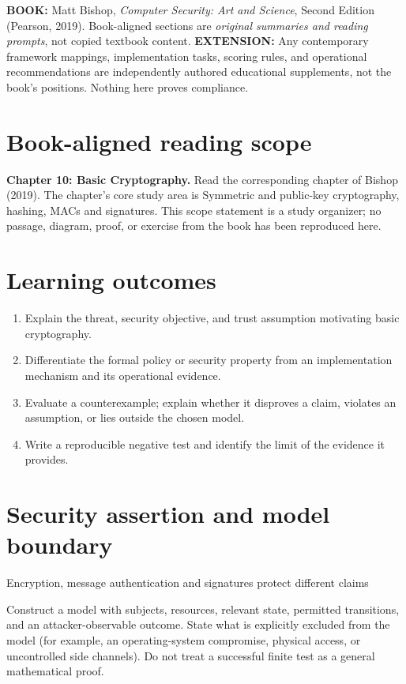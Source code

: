 \documentclass[10pt,letterpaper]{article}
\begin{document}
\makedoctocpage
\begin{notebox}
\textbf{BOOK:} Matt Bishop, \emph{Computer Security: Art and Science}, Second Edition (Pearson, 2019). Book-aligned sections are \emph{original summaries and reading prompts}, not copied textbook content.
\textbf{EXTENSION:} Any contemporary framework mappings, implementation tasks, scoring rules, and operational recommendations are independently authored educational supplements, not the book's positions. Nothing here proves compliance.
\end{notebox}
\section{Book-aligned reading scope}
\textbf{Chapter 10: Basic Cryptography.} Read the corresponding chapter of Bishop (2019). The chapter's core study area is Symmetric and public-key cryptography, hashing, MACs and signatures. This scope statement is a study organizer; no passage, diagram, proof, or exercise from the book has been reproduced here.
\section{Learning outcomes}
\begin{enumerate}
\item Explain the threat, security objective, and trust assumption motivating basic cryptography.
\item Differentiate the formal policy or security property from an implementation mechanism and its operational evidence.
\item Evaluate a counterexample; explain whether it disproves a claim, violates an assumption, or lies outside the chosen model.
\item Write a reproducible negative test and identify the limit of the evidence it provides.
\end{enumerate}
\section{Security assertion and model boundary}
\begin{infobox}
Encryption, message authentication and signatures protect different claims
\end{infobox}
Construct a model with subjects, resources, relevant state, permitted transitions, and an attacker-observable outcome. State what is explicitly excluded from the model (for example, an operating-system compromise, physical access, or uncontrolled side channels). Do not treat a successful finite test as a general mathematical proof.
\end{document}
